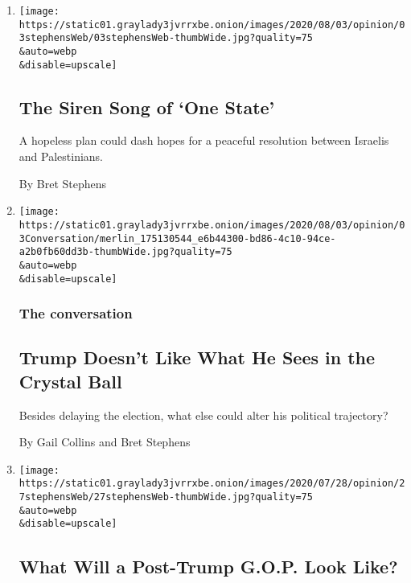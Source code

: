 \begin{enumerate}
\def\labelenumi{\arabic{enumi}.}
\item
  \href{/2020/08/03/opinion/israel-palestine-one-state-solution.html}{}

  \texttt{[image: https://static01.graylady3jvrrxbe.onion/images/2020/08/03/opinion/03stephensWeb/03stephensWeb-thumbWide.jpg?quality=75\\\&auto=webp\\\&disable=upscale]}

  \hypertarget{the-siren-song-of-one-state}{%
  \subsection{The Siren Song of `One
  State'}\label{the-siren-song-of-one-state}}

  A hopeless plan could dash hopes for a peaceful resolution between
  Israelis and Palestinians.

  By Bret Stephens
\item
  \href{/2020/08/03/opinion/trump-biden-2020.html}{}

  \texttt{[image: https://static01.graylady3jvrrxbe.onion/images/2020/08/03/opinion/03Conversation/merlin\_175130544\_e6b44300-bd86-4c10-94ce-a2b0fb60dd3b-thumbWide.jpg?quality=75\\\&auto=webp\\\&disable=upscale]}

  \hypertarget{the-conversation}{%
  \subsubsection{The conversation}\label{the-conversation}}

  \hypertarget{trump-doesnt-like-what-he-sees-in-the-crystal-ball}{%
  \subsection{Trump Doesn't Like What He Sees in the Crystal
  Ball}\label{trump-doesnt-like-what-he-sees-in-the-crystal-ball}}

  Besides delaying the election, what else could alter his political
  trajectory?

  By Gail Collins and Bret Stephens
\item
  \href{/2020/07/27/opinion/trump-2020.html}{}

  \texttt{[image: https://static01.graylady3jvrrxbe.onion/images/2020/07/28/opinion/27stephensWeb/27stephensWeb-thumbWide.jpg?quality=75\\\&auto=webp\\\&disable=upscale]}

  \hypertarget{what-will-a-post-trump-gop-look-like}{%
  \subsection{What Will a Post-Trump G.O.P. Look
  Like?}\label{what-will-a-post-trump-gop-look-like}}


\end{enumerate}
